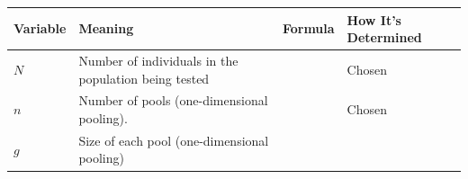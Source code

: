\documentclass[letterpaper]{article}
\begin{document}
\begin{footnotesize}

\begin{longtable}[]{@{}llll@{}}
\toprule
\begin{minipage}[b]{0.08\columnwidth}\raggedright
	Variable\strut
\end{minipage} & \begin{minipage}[b]{0.28\columnwidth}\raggedright
	Meaning\strut
\end{minipage} & \begin{minipage}[b]{0.28\columnwidth}\raggedright
	Formula\strut
\end{minipage} & \begin{minipage}[b]{0.24\columnwidth}\raggedright
	How It's Determined\strut
\end{minipage}\tabularnewline
\midrule
\endhead
\begin{minipage}[t]{0.08\columnwidth}\raggedright
	$N$\strut
\end{minipage} & \begin{minipage}[t]{0.28\columnwidth}\raggedright
	Number of individuals in the population being tested\strut
\end{minipage} & \begin{minipage}[t]{0.28\columnwidth}\raggedright
	\strut
\end{minipage} & \begin{minipage}[t]{0.24\columnwidth}\raggedright
	Chosen\strut
\end{minipage}\tabularnewline
\begin{minipage}[t]{0.08\columnwidth}\raggedright
	$n$\strut
\end{minipage} & \begin{minipage}[t]{0.28\columnwidth}\raggedright
	Number of pools (one-dimensional pooling).\strut
\end{minipage} & \begin{minipage}[t]{0.28\columnwidth}\raggedright
	\strut
\end{minipage} & \begin{minipage}[t]{0.24\columnwidth}\raggedright
	Chosen\strut
\end{minipage}\tabularnewline
\begin{minipage}[t]{0.08\columnwidth}\raggedright
	$g$\strut
\end{minipage} & \begin{minipage}[t]{0.28\columnwidth}\raggedright
	Size of each pool (one-dimensional pooling)\strut
\end{minipage} & \begin{minipage}[t]{0.28\columnwidth}\raggedright

\end{minipage}
\end{longtable}
\end{footnotesize}
\end{document}
